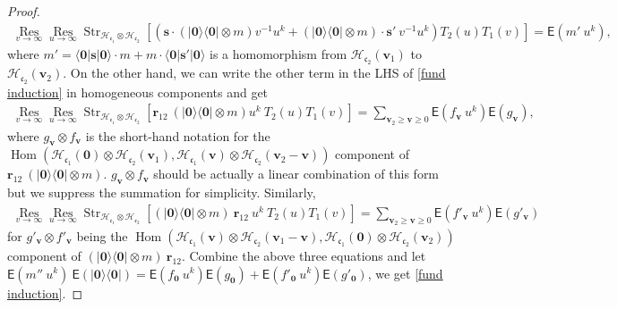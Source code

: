 \documentclass[10pt,a4paper]{amsart}
\newcommand{\Hom}{\operatorname{Hom}}
\newcommand{\Res}{\operatorname{Res}}
\newcommand{\bv}{\mathbf{v}}
\newcommand{\cH}{\mathcal{H}}
\newcommand{\str}{\operatorname{Str}}
\begin{document}
\begin{proof}
\begin{align*}
    \underset{v\to \infty}{\Res}\underset{u\to \infty}{\Res}\str_{\cH_{\mathfrak{c}_1}\otimes \cH_{\mathfrak{c}_2}}
\left[\left(\pmb s\cdot(|\mathbf 0\rangle\langle\mathbf 0| \otimes m)v^{-1}u^k+(|\mathbf 0\rangle\langle\mathbf 0| \otimes m)\cdot \pmb s'\:v^{-1}u^k\right)T_2(u)T_{1}(v)\right]=\mathsf E\left(m'\:u^k \right),
\end{align*}
where $m'=\langle\mathbf 0|\pmb s |\mathbf 0\rangle \cdot m+m\cdot\langle\mathbf 0|\pmb s' |\mathbf 0\rangle$ is a homomorphism from $\cH_{\mathfrak{c}_2}(\bv_1)$ to $\cH_{\mathfrak{c}_2}(\bv_2)$. On the other hand, we can write the other term in the LHS of \eqref{fund induction} in homogeneous components and get 
\begin{align*}
    \underset{v\to \infty}{\Res}\underset{u\to \infty}{\Res}\str_{\cH_{\mathfrak{c}_1}\otimes \cH_{\mathfrak{c}_2}}
\left[\pmb r_{12}\:(|\mathbf 0\rangle\langle\mathbf 0| \otimes m)u^{k}\:T_2(u)T_{1}(v)\right]=\sum_{\bv_2\geqslant\bv\geqslant 0}\mathsf E(f_{\bv}\: u^{k})\mathsf E(g_{\bv}),
\end{align*}
where $g_{\bv}\otimes f_{\bv}$ is the short-hand notation for the $\Hom(\cH_{\mathfrak{c}_1}(\mathbf 0)\otimes \cH_{\mathfrak{c}_2}(\bv_1),\cH_{\mathfrak{c}_1}(\bv)\otimes \cH_{\mathfrak{c}_2}(\bv_2-\bv))$ component of $\pmb r_{12}\:(|\mathbf 0\rangle\langle\mathbf 0| \otimes m)$. $g_{\bv}\otimes f_{\bv}$ should be actually a linear combination of this form but we suppress the summation for simplicity. Similarly,
\begin{align*}
    \underset{v\to \infty}{\Res}\underset{u\to \infty}{\Res}\str_{\cH_{\mathfrak{c}_1}\otimes \cH_{\mathfrak{c}_2}}
\left[(|\mathbf 0\rangle\langle\mathbf 0| \otimes m)\:\pmb r_{12}\:u^{k}\:T_2(u)T_{1}(v)\right]=\sum_{\bv_2\geqslant\bv\geqslant 0}\mathsf E(f'_{\bv}\: u^{k})\mathsf E(g'_{\bv})
\end{align*}
for $g'_{\bv}\otimes f'_{\bv}$ being the $\Hom(\cH_{\mathfrak{c}_1}(\bv)\otimes \cH_{\mathfrak{c}_2}(\bv_1-\bv),\cH_{\mathfrak{c}_1}(\mathbf 0)\otimes \cH_{\mathfrak{c}_2}(\bv_2))$ component of $(|\mathbf 0\rangle\langle\mathbf 0| \otimes m)\:\pmb r_{12}$. Combine the above three equations and let $\mathsf E(m''\: u^{k})\:\mathsf E(|\mathbf 0\rangle\langle\mathbf 0|)=\mathsf E(f_{\mathbf 0}\: u^{k})\mathsf E(g_{\mathbf 0})+\mathsf E(f'_{\mathbf 0}\: u^{k})\mathsf E(g'_{\mathbf 0})$, we get \eqref{fund induction}.
\end{proof}
\end{document}
